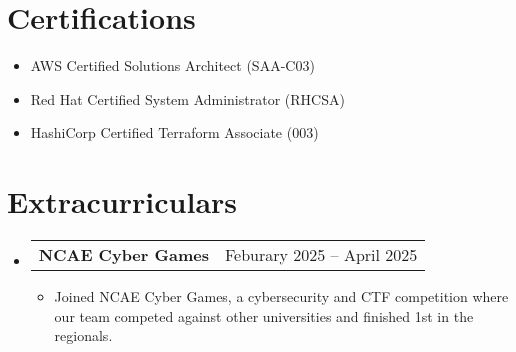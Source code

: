 \documentclass[letterpaper,11pt]{article}
\makeatletter
\newcommand{\resumeItem}[1]{
  \item\small{
    {#1 \vspace{-2pt}}
  }
}
\newcommand{\resumeProjectHeading}[2]{
    \item
    \begin{tabular*}{0.97\textwidth}{l@{\extracolsep{\fill}}r}
      \small#1 & #2 \\
    \end{tabular*}\vspace{-7pt}
}
\newcommand{\resumeSubHeadingListStart}{\begin{itemize}[leftmargin=0.08in, label={}]}
\newcommand{\resumeSubHeadingListEnd}{\end{itemize}}
\newcommand{\resumeItemListStart}{\begin{itemize}[leftmargin=0.22in]}
\newcommand{\resumeItemListEnd}{\end{itemize}\vspace{-5pt}}
\makeatother
\begin{document}
\section{Certifications}
    \vspace{-15pt} %
    \vspace{1pt}
    \begin{multicols}{1}
        \begin{itemize}[itemsep=-1pt, parsep=3pt, leftmargin=0.22in]
        \small
            \item AWS Certified Solutions Architect (SAA-C03)
            \item Red Hat Certified System Administrator (RHCSA)
            \item HashiCorp Certified Terraform Associate (003)
        \end{itemize}
    \end{multicols}

\section{Extracurriculars}
  \resumeSubHeadingListStart
    \vspace{-2pt}
    \resumeProjectHeading
      {\textbf{NCAE Cyber Games}}{Feburary 2025 -- April 2025}
      \resumeItemListStart
        \vspace{1pt}
        \resumeItem{Joined NCAE Cyber Games, a cybersecurity and CTF competition where our team competed against other universities and finished 1st in the regionals.}
      \resumeItemListEnd
      
  \resumeSubHeadingListEnd


\end{document}
